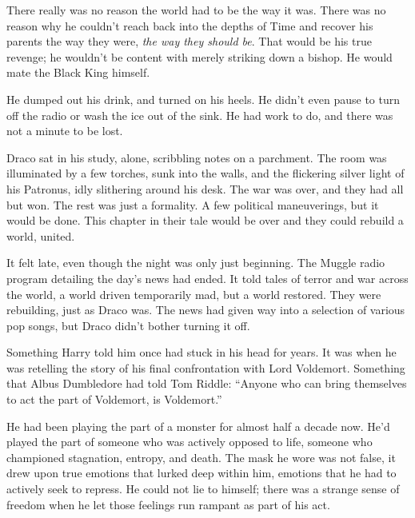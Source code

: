 There really was no reason the world had to be the way it was. There was no reason why he couldn’t reach back into the depths of Time and recover his parents the way they were, \textit{the way they should be}. That would be his true revenge; he wouldn’t be content with merely striking down a bishop. He would mate the Black King himself.


He dumped out his drink, and turned on his heels. He didn’t even pause to turn off the radio or wash the ice out of the sink. He had work to do, and there was not a minute to be lost.
\simpleline
{}

Draco sat in his study, alone, scribbling notes on a parchment. The room was illuminated by a few torches, sunk into the walls, and the flickering silver light of his Patronus, idly slithering around his desk. The war was over, and they had all but won. The rest was just a formality. A few political maneuverings, but it would be done. This chapter in their tale would be over and they could rebuild a world, united.

It felt late, even though the night was only just beginning. The Muggle radio program detailing the day’s news had ended. It told tales of terror and war across the world, a world driven temporarily mad, but a world restored. They were rebuilding, just as Draco was. The news had given way into a selection of various pop songs, but Draco didn’t bother turning it off.


Something Harry told him once had stuck in his head for years. It was when he was retelling the story of his final confrontation with Lord Voldemort. Something that Albus Dumbledore had told Tom Riddle: “Anyone who can bring themselves to act the part of Voldemort, is Voldemort.”

He had been playing the part of a monster for almost half a decade now. He’d played the part of someone who was actively opposed to life, someone who championed stagnation, entropy, and death. The mask he wore was not false, it drew upon true emotions that lurked deep within him, emotions that he had to actively seek to repress. He could not lie to himself; there was a strange sense of freedom when he let those feelings run rampant as part of his act.

